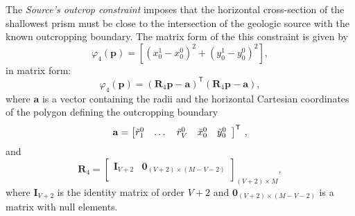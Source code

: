 The \textit{Source’s outcrop constraint} imposes that the horizontal cross-section of the shallowest prism 
must be close to the intersection of the geologic source with the known outcropping boundary. 
The matrix form of the this constraint is given by
\begin{equation}\label{eq:phi4}
\varphi_{4}(\mathbf{p}) = \left[\left(x_{0}^{1} - x_{0}^{0}\right)^2 + \left(y_{0}^{1} - y_0^0\right)^2\right] ,
\end{equation}
in matrix form:
\begin{equation}
\varphi_{4}(\mathbf{p}) = \left(\mathbf{R}_{4} \mathbf{p} - \mathbf{a} \right)^{\mathsf{T}} 
\left(\mathbf{R}_{4} \mathbf{p} - \mathbf{a} \right) ,
\end{equation}
where $\mathbf{a}$ is a vector containing the radii and the horizontal Cartesian coordinates of the 
polygon defining the outcropping boundary
\begin{equation}
\mathbf{a} = \left[ \begin{array}{@{}*{12}{c}@{}}
\tilde{r}_{1}^{0} & \dots & \tilde{r}_{V}^{0} & \tilde{x}_{0}^{0} & \tilde{y}_{0}^{0} \\
\end{array} \right]^{\mathsf{T}} \: ,
\label{eq:a-vector}
\end{equation}
and
\begin{equation}
\mathbf{R}_{4} = 
\begin{bmatrix}
\mathbf{I}_{V+2} & \mathbf{0}_{(V+2) \times (M-V-2)} \\
\end{bmatrix}_{(V+2)\times M},
\label{eq:R4-matrix}
\end{equation}
where $\mathbf{I}_{V+2}$ is the identity matrix of order $V+2$ and $\mathbf{0}_{(V+2) \times (M-V-2)}$ is a matrix 
with null elements.

